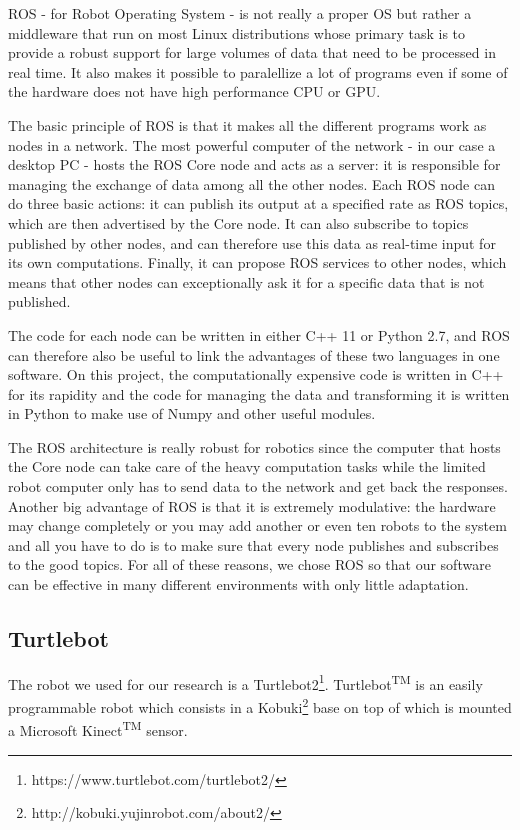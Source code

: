 ROS \cite{ROS} - for Robot Operating System - is not really a proper OS but rather a middleware that run on most Linux distributions whose primary task is to provide a robust support for large volumes of data that need to be processed in real time. It also makes it possible to paralellize a lot of programs even if some of the hardware does not have high performance CPU or GPU.

The basic principle of ROS is that it makes all the different programs work as nodes in a network. The most powerful computer of the network - in our case a desktop PC - hosts the ROS Core node and acts as a server: it is responsible for managing the exchange of data among all the other nodes. Each ROS node can do three basic actions: it can publish its output at a specified rate as ROS topics, which are then advertised by the Core node. It can also subscribe to topics published by other nodes, and can therefore use this data as real-time input for its own computations. Finally, it can propose ROS services to other nodes, which means that other nodes can exceptionally ask it for a specific data that is not published. 

The code for each node can be written in either C++ 11 or Python 2.7, and ROS can therefore also be useful to link the advantages of these two languages in one software. On this project, the computationally expensive code is written in C++ for its rapidity and the code for managing the data and transforming it is written in Python to make use of Numpy and other useful modules.

The ROS architecture is really robust for robotics since the computer that hosts the Core node can take care of the heavy computation tasks while the limited robot computer only has to send data to the network and get back the responses. Another big advantage of ROS is that it is extremely modulative: the hardware may change completely or you may add another or even ten robots to the system and all you have to do is to make sure that every node publishes and subscribes to the good topics. For all of these reasons, we chose ROS so that our software can be effective in many different environments with only little adaptation.

\subsection{Turtlebot}
The robot we used for our research is a Turtlebot2\footnote{https://www.turtlebot.com/turtlebot2/}. Turtlebot\textsuperscript{TM} is an easily programmable robot which consists in a Kobuki\footnote{http://kobuki.yujinrobot.com/about2/} base on top of which is mounted a Microsoft Kinect\textsuperscript{TM} sensor. 

